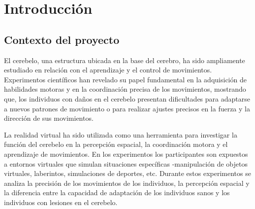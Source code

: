\documentclass[a4paper,11pt, oneside]{book}
\begin{document}


%

%
%
%
%
%
%
%
%
%
%
%
%
%
%
%
%
%
%
%
%
%
%
\tableofcontents

\chapter{Introducción}

\section{Contexto del proyecto}

El cerebelo, una estructura ubicada en la base del cerebro, ha sido ampliamente estudiado en relación con el aprendizaje y el control de movimientos. Experimentos científicos han revelado su papel fundamental en la adquisición de habilidades motoras y en la coordinación precisa de los movimientos, mostrando que, los individuos con daños en el cerebelo presentan dificultades para adaptarse a nuevos patrones de movimiento o para realizar ajustes precisos en la fuerza y la dirección de sus movimientos.

La realidad virtual ha sido utilizada como una herramienta para investigar la función del cerebelo en la percepción espacial, la coordinación motora y el aprendizaje de movimientos. En los experimentos los participantes son expuestos a entornos virtuales que simulan situaciones específicas -manipulación de objetos virtuales, laberintos, simulaciones de deportes, etc. Durante estos experimentos se analiza la precisión de los movimientos de los individuos, la percepción espacial y la diferencia entre la capacidad de adaptación de los individuos sanos y los individuos con lesiones en el cerebelo.
\end{document}
